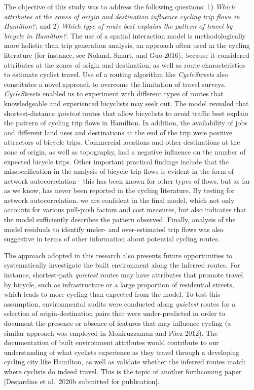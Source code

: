 \documentclass[smallextended]{svjour3}       %
\begin{document}
The objective of this study was to address the following questions: 1)
\emph{Which attributes at the zones of origin and destination influence
cycling trip flows in Hamilton?}; and 2) \emph{Which type of route best
explains the pattern of travel by bicycle in Hamilton?}. The use of a
spatial interaction model is methodologically more holistic than trip
generation analysis, an approach often used in the cycling literature
(for instance, see Noland, Smart, and Guo 2016), because it considered
attributes at the zones of origin and destination, as well as route
characteristics to estimate cyclist travel. Use of a routing algorithm
like \emph{CycleStreets} also constitutes a novel approach to overcome
the limitation of travel surveys. \emph{CycleStreets} enabled us to
experiment with different types of routes that knowledgeable and
experienced bicyclists may seek out. The model revealed that
shortest-distance \emph{quietest} routes that allow bicyclists to avoid
traffic best explain the pattern of cycling trip flows in Hamilton. In
addition, the availability of jobs and different land uses and
destinations at the end of the trip were positive attractors of bicycle
trips. Commercial locations and other destinations at the zone of
origin, as well as topography, had a negative influence on the number of
expected bicycle trips. Other important practical findings include that
the misspecification in the analysis of bicycle trip flows is evident in
the form of network autocorrelation - this has been known for other
types of flows, but as far as we know, has never been reported in the
cycling literature. By testing for network autocorrelation, we are
confident in the final model, which not only accounts for various
pull-push factors and cost measures, but also indicates that the model
sufficiently describes the pattern observed. Finally, analysis of the
model residuals to identify under- and over-estimated trip flows was
also suggestive in terms of other information about potential cycling
routes.

The approach adopted in this research also presents future opportunities
to systematically investigate the built environment along the inferred
routes. For instance, shortest-path \emph{quietest} routes may have
attributes that promote travel by bicycle, such as infrastructure or a
large proportion of residential streets, which leads to more cycling
than expected from the model. To test this assumption, environmental
audits were conducted along \emph{quietest} routes for a selection of
origin-destination pairs that were under-predicted in order to document
the presence or absence of features that may influence cycling (a
similar approach was employed in Moniruzzaman and Páez 2012). The
documentation of built environment attributes would contribute to our
understanding of what cyclists experience as they travel through a
developing cycling city like Hamilton, as well as validate whether the
inferred routes match where cyclists do indeed travel. This is the topic
of another forthcoming paper {[}Desjardins et al.~2020b submitted for
publication{]}.
\end{document}
